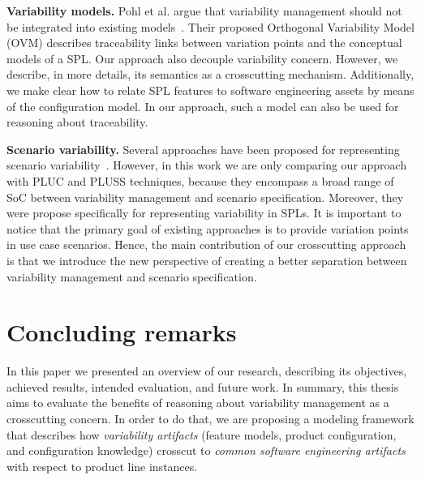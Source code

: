 \documentclass[times, 11pt,twocolumn]{article}
\begin{document}
{\bf Variability models.} Pohl et al. argue that variability management
should not be integrated into existing models~\cite{Pohl:2005aa}. Their
proposed Orthogonal Variability Model (OVM) describes traceability links between variation
points and the conceptual models of a SPL. Our approach also decouple
variability concern. However, we describe, in more details,
its semantics as a crosscutting mechanism. Additionally, we make
clear how to relate SPL features to software engineering assets by
means of the configuration model. In our approach, such a model
can also be used for reasoning about traceability.  

{\bf Scenario variability.} Several approaches have been proposed for
representing scenario variability~\cite{Jacobson:1997aa, Griss:1998aa,
Eriksson:2005aa,Bertolino:2003aa}. However, in this work we are only comparing
our approach with PLUC and PLUSS techniques, because they encompass a broad range
of SoC between variability management and scenario specification. Moreover, they
were propose specifically for representing variability in SPLs. It is important
to notice that the primary goal of existing approaches is to provide variation
points in use case scenarios. Hence, the main contribution of our crosscutting
approach is that we introduce the new perspective of creating a better separation
between variability management and scenario specification.
 

\section{Concluding remarks}\label{sec:concludings}

In this paper we presented an overview of our research, describing its
objectives, achieved results, intended evaluation, and future work. In
summary, this thesis aims to evaluate the benefits of reasoning
about variability management as a crosscutting concern. In order to do that, we
are proposing a modeling framework that describes how \emph{variability
artifacts} (feature models, product configuration, and configuration knowledge)
crosscut to \emph{common software engineering artifacts} with respect to
product line instances.
\end{document}
